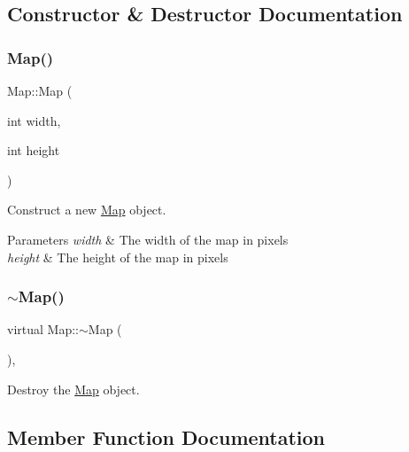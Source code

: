 \subsection{Constructor \& Destructor Documentation}
\mbox{\label{classMap_a8497952fd6e1f0584d868e6ceb97d42d}} 
\subsubsection{\texorpdfstring{Map()}{Map()}}
{\footnotesize\ttfamily Map\+::\+Map (\begin{DoxyParamCaption}\item[{int}]{width,  }\item[{int}]{height }\end{DoxyParamCaption})}



Construct a new \mbox{\hyperlink{classMap}{Map}} object. 


\begin{DoxyParams}{Parameters}
{\em width} & The width of the map in pixels \\
\hline
{\em height} & The height of the map in pixels \\
\hline
\end{DoxyParams}
\mbox{\label{classMap_a1debdd8c6fec2993906ec9626045c80c}} 
\subsubsection{\texorpdfstring{$\sim$Map()}{~Map()}}
{\footnotesize\ttfamily virtual Map\+::$\sim$\+Map (\begin{DoxyParamCaption}{ }\end{DoxyParamCaption})\hspace{0.3cm}{\ttfamily [virtual]}, {\ttfamily [default]}}



Destroy the \mbox{\hyperlink{classMap}{Map}} object. 



\subsection{Member Function Documentation}
\mbox{\label{classMap_acbc620429ff8e8de0a62ad322581535f}} 
